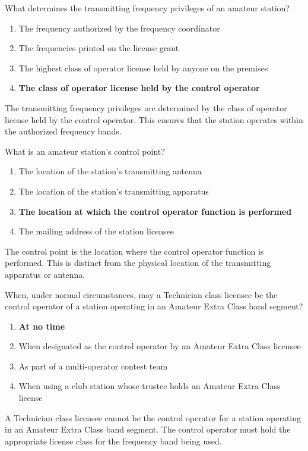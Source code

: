 
\begin{tcolorbox}[colback=gray!10!white,colframe=black!75!black,title={T1E04}]
What determines the transmitting frequency privileges of an amateur station?
\begin{enumerate}[label=\Alph*,noitemsep]
    \item The frequency authorized by the frequency coordinator
    \item The frequencies printed on the license grant
    \item The highest class of operator license held by anyone on the premises
    \item \textbf{The class of operator license held by the control operator}
\end{enumerate}
\end{tcolorbox}
The transmitting frequency privileges are determined by the class of operator license held by the control operator. This ensures that the station operates within the authorized frequency bands.


\begin{tcolorbox}[colback=gray!10!white,colframe=black!75!black,title={T1E05}]
What is an amateur station’s control point?
\begin{enumerate}[label=\Alph*,noitemsep]
    \item The location of the station’s transmitting antenna
    \item The location of the station’s transmitting apparatus
    \item \textbf{The location at which the control operator function is performed}
    \item The mailing address of the station licensee
\end{enumerate}
\end{tcolorbox}
The control point is the location where the control operator function is performed. This is distinct from the physical location of the transmitting apparatus or antenna.


\begin{tcolorbox}[colback=gray!10!white,colframe=black!75!black,title={T1E06}]
When, under normal circumstances, may a Technician class licensee be the control operator of a station operating in an Amateur Extra Class band segment?
\begin{enumerate}[label=\Alph*,noitemsep]
    \item \textbf{At no time}
    \item When designated as the control operator by an Amateur Extra Class licensee
    \item As part of a multi-operator contest team
    \item When using a club station whose trustee holds an Amateur Extra Class license
\end{enumerate}
\end{tcolorbox}
A Technician class licensee cannot be the control operator for a station operating in an Amateur Extra Class band segment. The control operator must hold the appropriate license class for the frequency band being used.

